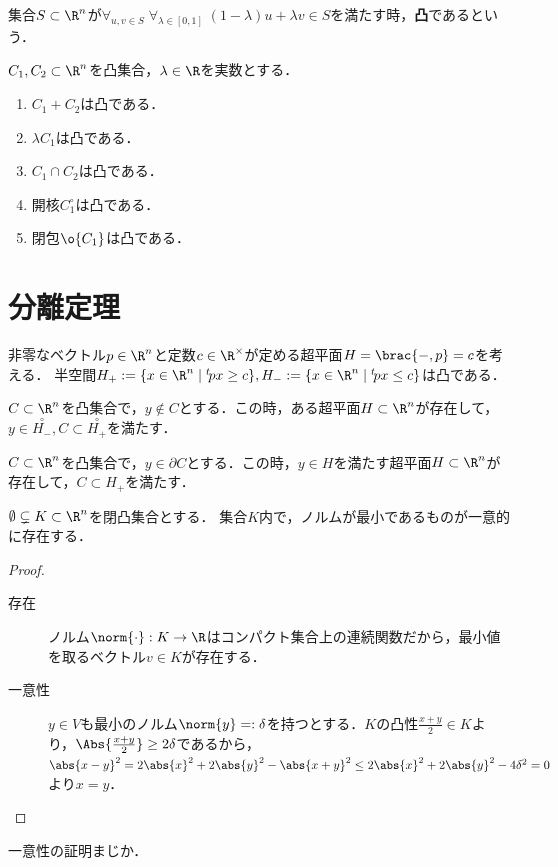 \documentclass[uplatex,dvipdfmx]{jsreport}
\begin{document}
\begin{definition}
    集合$S\subset\R^n$が$\forall_{u,v\in S}\;\forall_{\lambda\in[0,1]}\;(1-\lambda)u+\lambda v\in S$を満たす時，\textbf{凸}であるという．
\end{definition}

\begin{lemma}
    $C_1,C_2\subset\R^n$を凸集合，$\lambda\in\R$を実数とする．
    \begin{enumerate}
        \item $C_1+C_2$は凸である．
        \item $\lambda C_1$は凸である．
        \item $C_1\cap C_2$は凸である．
        \item 開核$C_1^\circ$は凸である．
        \item 閉包$\o{C_1}$は凸である．
    \end{enumerate}
\end{lemma}

\section{分離定理}

\begin{lemma}[超平面]
    非零なベクトル$p\in\R^n$と定数$c\in\R^\times$が定める超平面$H=\brac{-,p}=c$を考える．
    半空間$H_+:=\{x\in\R^n\mid {}^t\!px\ge c\},H_-:=\{x\in\R^n\mid {}^t\!px\le c\}$は凸である．
\end{lemma}

\begin{proposition}\label{prop-separation-1}
    $C\subset\R^n$を凸集合で，$y\notin C$とする．この時，ある超平面$H\subset\R^n$が存在して，$y\in\overset{\circ}{H_-},C\subset\overset{\circ}{H_+}$を満たす．
\end{proposition}

\begin{proposition}
    $C\subset\R^n$を凸集合で，$y\in\partial C$とする．この時，$y\in H$を満たす超平面$H\subset\R^n$が存在して，$C\subset H_+$を満たす．
\end{proposition}

\begin{lemma}
    $\emptyset\subsetneq K\subset\R^n$を閉凸集合とする．
    集合$K$内で，ノルムが最小であるものが一意的に存在する．
\end{lemma}
\begin{proof}\mbox{}
    \begin{description}
        \item[存在] ノルム$\norm{\cdot}:K\to\R$はコンパクト集合上の連続関数だから，最小値を取るベクトル$v\in K$が存在する．
        \item[一意性] $y\in V$も最小のノルム$\norm{y}=:\delta$を持つとする．$K$の凸性$\frac{x+y}{2}\in K$より，$\Abs{\frac{x+y}{2}}\ge 2\delta$であるから，$\abs{x-y}^2=2\abs{x}^2+2\abs{y}^2-\abs{x+y}^2\le 2\abs{x}^2+2\abs{y}^2-4\delta^2=0$より$x=y$．
    \end{description}
\end{proof}
\begin{remarks}
    一意性の証明まじか．
\end{remarks}
\end{document}
